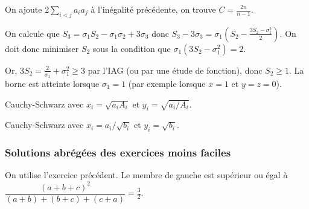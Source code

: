 \begin{sol}
On ajoute $2\sum_{i<j}a_ia_j$ \`a l'in\'egalit\'e pr\'ec\'edente, on trouve $C=\frac{2n}{n-1}$.
\end{sol}

\begin{sol}
 On calcule que $S_3=\sigma_1S_2-\sigma_1\sigma_2+3\sigma_3$ donc $S_3-3\sigma_3=\sigma_1(S_2-\frac{3S_2-\sigma_1^2}{2})$.
On doit donc minimiser $S_2$ sous la condition que $\sigma_1(3S_2-\sigma_1^2)=2$.

Or, $3S_2=\frac{2}{\sigma_1}+\sigma_1^2\geqslant 3$ par l'IAG (ou par une \'etude de fonction), donc $S_2\geqslant 1$. La borne est atteinte lorsque
$\sigma_1=1$ (par exemple lorsque $x=1$ et $y=z=0$).
\end{sol}

\begin{sol}
 Cauchy-Schwarz avec $x_i=\sqrt{a_iA_i}$ et $y_i=\sqrt{a_i/A_i}$.
\end{sol}

\begin{sol}
 Cauchy-Schwarz avec $x_i=a_i/\sqrt{b_i}$ et $y_i=\sqrt{b_i}$.
\end{sol}

\subsubsection{Solutions abr\'eg\'ees des exercices moins faciles}
\begin{sol}
On utilise l'exercice pr\'ec\'edent. Le membre de gauche est sup\'erieur ou \'egal \`a $\dfrac{(a+b+c)^2}{(a+b)+(b+c)+(c+a)}=\frac{3}{2}$.
% 
\end{sol}


